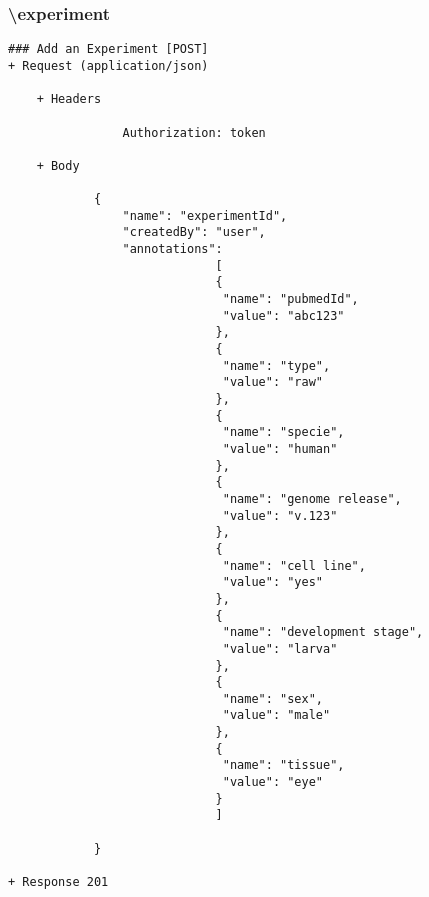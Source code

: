 \subsubsection*{\textbackslash experiment} 
\begin{verbatim}
### Add an Experiment [POST]
+ Request (application/json)

    + Headers
    
                Authorization: token
                
    + Body 
    
            {
                "name": "experimentId",
                "createdBy": "user",
                "annotations": 
                             [
                             {
                              "name": "pubmedId",
                              "value": "abc123"
                             }, 
                             {
                              "name": "type",
                              "value": "raw"
                             },
                             {
                              "name": "specie",
                              "value": "human"
                             },
                             {
                              "name": "genome release",
                              "value": "v.123"
                             },
                             {
                              "name": "cell line",
                              "value": "yes"
                             },
                             {
                              "name": "development stage",
                              "value": "larva"
                             },
                             {
                              "name": "sex",
                              "value": "male"
                             },
                             {
                              "name": "tissue",
                              "value": "eye"
                             }
                             ]
                
            }
        
+ Response 201
\end{verbatim}

